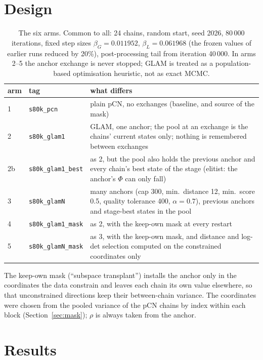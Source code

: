 \documentclass[11pt]{article}
\begin{document}
\section{Design}
\begin{table}[h]\centering\small
\begin{tabular}{@{}llp{9.2cm}@{}}\toprule
arm & tag & what differs \\ \midrule
1 & \texttt{s80k\_pcn} & plain pCN, no exchanges (baseline, and source of the mask) \\
2 & \texttt{s80k\_glam1} & GLAM, one anchor; the pool at an exchange is the chains' current states only; nothing is remembered between exchanges \\
2b & \texttt{s80k\_glam1\_best} & as 2, but the pool also holds the previous anchor and every chain's best state of the stage (elitist: the anchor's $\Phi$ can only fall) \\
3 & \texttt{s80k\_glamN} & many anchors (cap 300, min.\ distance 12, min.\ score 0.5, quality tolerance 400, $\alpha=0.7$), previous anchors and stage-best states in the pool \\
4 & \texttt{s80k\_glam1\_mask} & as 2, with the keep-own mask at every restart \\
5 & \texttt{s80k\_glamN\_mask} & as 3, with the keep-own mask, and distance and log-det selection computed on the constrained coordinates only \\ \bottomrule
\end{tabular}
\caption{The six arms. Common to all: 24 chains, random start, seed 2026, 80\,000 iterations, fixed step sizes $\beta_G=0.011952$, $\beta_L=0.061968$ (the frozen values of earlier runs reduced by 20\%), post-processing tail from iteration 40\,000. In arms 2--5 the anchor exchange is never stopped; GLAM is treated as a population-based optimisation heuristic, not as exact MCMC.}
\end{table}
The keep-own mask (``subspace transplant'') installs the anchor only in the coordinates the data constrain and leaves each chain its own value elsewhere, so that unconstrained directions keep their between-chain variance. The coordinates were chosen from the pooled variance of the pCN chains by index within each block (Section~\ref{sec:mask}); $\rho$ is always taken from the anchor.

\section{Results}
\end{document}
